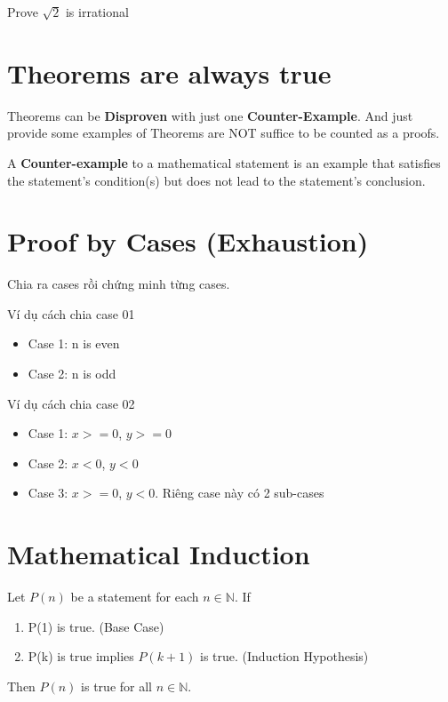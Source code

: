 Prove $\sqrt{2}$ is irrational

\section{Theorems are always true}

Theorems can be \textbf{Disproven} with just one \textbf{Counter-Example}. And just provide some examples of Theorems are NOT suffice to be counted as a proofs.

A \textbf{Counter-example} to a mathematical statement is an example that satisfies the statement's condition(s) but does not lead to the statement's conclusion.

\section{Proof by Cases (Exhaustion)}

Chia ra cases rồi chứng minh từng cases.

Ví dụ cách chia case 01

\begin{itemize}
  \item Case 1: n is even
  \item Case 2: n is odd
\end{itemize}

Ví dụ cách chia case 02

\begin{itemize}
  \item Case 1: $x>=0$, $y>=0$
  \item Case 2: $x<0$, $y<0$
  \item Case 3: $x>=0$, $y<0$. Riêng case này có 2 sub-cases
\end{itemize}

\section{Mathematical Induction}

Let $P(n)$ be a statement for each $n \in \mathbb{N}$. If

\begin{enumerate}
  \item P(1) is true. (Base Case)
  \item P(k) is true implies $P(k+1)$ is true. (Induction Hypothesis)
\end{enumerate}

Then $P(n)$ is true for all $n \in \mathbb{N}$.

\vspace{.3cm}

